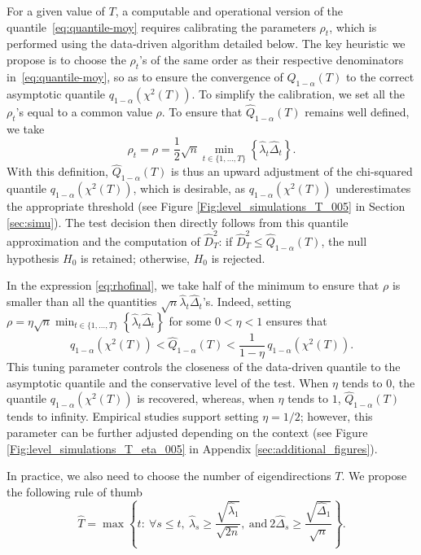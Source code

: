 \documentclass[twoside,11pt]{article}
\newcommand{\nb}{n}
\newcommand{\trueq}[1]{q_{1-\alpha}(#1) }
\newcommand{\hatqmajfin}{\widehat{Q}}
\begin{document}
For a given value of $T$, a computable and operational version of the quantile~\eqref{eq:quantile-moy} requires calibrating the parameters $\rho_t$, which is performed using the data-driven algorithm detailed below.
The key heuristic we propose is to choose the $\rho_t$'s of the same order as their respective denominators in~\eqref{eq:quantile-moy}, so as to ensure the convergence of $\hatqmajfin_{1-\alpha}(T)$ to the correct asymptotic quantile $\trueq{\chi^2(T)}$. To simplify the calibration, we set all the $\rho_t$’s equal to a common value $\rho$. To ensure that $\hatqmajfin_{1-\alpha}(T)$ remains well defined, we take
\begin{equation}
\label{eq:rhofinal}
\rho_t = \rho = \frac 12  \sqrt{\nb} \underset{t \in \{1,\ldots,T\}}{\min} \left\{ \widehat{\lambda}_t \widehat{\Delta}_t \right\} .
\end{equation}
With this definition, $\hatqmajfin_{1-\alpha}(T)$ is thus an upward adjustment of the chi-squared quantile $\trueq{\chi^2(T)}$, which is desirable, as $\trueq{\chi^2(T)}$ underestimates the appropriate threshold (see Figure \ref{Fig:level_simulations_T_005} in Section \ref{sec:simu}).
The test decision then directly follows from this quantile approximation and the computation of $\widehat{D}^2_T$: if $\widehat{D}^2_T \leq \hatqmajfin_{1-\alpha}(T)$, the null hypothesis $H_0$ is retained; otherwise, $H_0$ is rejected.
\begin{remark} 
In the expression \eqref{eq:rhofinal}, we take half of the minimum to ensure that $\rho$ is smaller than  all the quantities $\sqrt{n}  \widehat{\lambda}_t \widehat{\Delta}_t$'s. Indeed, setting $ \rho = \eta \sqrt{\nb} \min_{t \in \{1,\ldots,T\}} \left\{ \widehat{\lambda}_t \widehat{\Delta}_t \right\}$ 
for some  $0 <\eta < 1$
ensures that
$$
\trueq{\chi^2(T)} < \hatqmajfin_{1-\alpha}(T)
< \frac{1}{1- \eta}\, \trueq{\chi^2(T)}.$$
This tuning parameter controls the closeness of the data-driven quantile to the asymptotic quantile and the conservative level of the test.
When $\eta$ tends to $0$, the quantile $\trueq{\chi^2(T)}$ is recovered, whereas, when $\eta$ tends to $1$, $\hatqmajfin_{1-\alpha}(T)$ tends to infinity. 
Empirical studies support setting $\eta = 1/2$;  however, this parameter can be further adjusted depending on the context (see Figure \ref{Fig:level_simulations_T_eta_005} in Appendix \ref{sec:additional_figures}).
\end{remark}
In practice, we also need to choose the number of eigendirections $T$. We propose the following rule of thumb
\begin{equation}
\label{eq:choixT}
\widehat T = \max \left\{ t : \ \forall s \leq t, \ 
\widehat{\lambda}_s \geq \frac{\sqrt{\widehat{\lambda}_1}}{\sqrt{2\nb}}, 
\ \text{and} \ 
2 \widehat{\Delta}_s \geq \frac{\sqrt{\widehat{\Delta}_1}}{\sqrt{\nb}} \right\}.
\end{equation}
\end{document}
